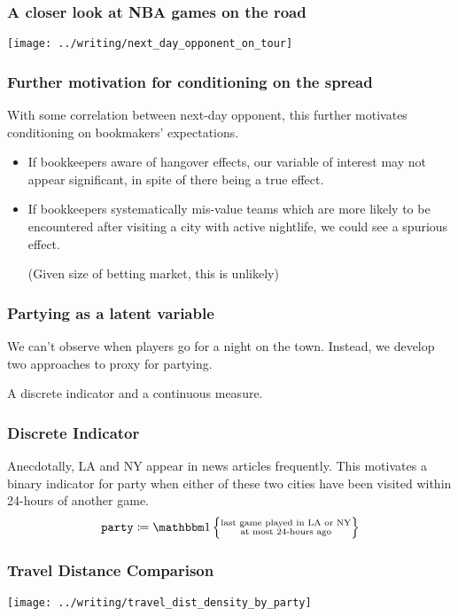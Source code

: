 \documentclass{beamer}
\begin{document}
\begin{frame}   \frametitle{A closer look at NBA games on the road}
  \centering \texttt{[image: ../writing/next\_day\_opponent\_on\_tour]} \end{frame}

\begin{frame}   \frametitle{Further motivation for conditioning on the spread}
  \begin{block}{With some correlation between next-day opponent, this further motivates conditioning
  on bookmakers' expectations.}
  \begin{itemize}     \item If bookkeepers aware of hangover effects, our variable of interest may not appear significant, in spite of there being a true effect.

    \item If bookkeepers systematically mis-value teams which are more likely to be encountered after visiting a city with active nightlife, we could see a spurious effect.

      (Given size of betting market, this is unlikely)
    \end{itemize}   \end{block}
\end{frame}

\begin{frame}   \frametitle{Partying as a latent variable}
  \begin{block}{We can't observe when players go for a night on the town.}
    Instead, we develop two approaches to proxy for partying. 

    A discrete indicator and a continuous measure.
  \end{block} \end{frame}

\begin{frame}   \frametitle{Discrete Indicator}
  \begin{block}{Anecdotally, LA and NY appear in news articles frequently.}     This motivates a binary indicator for party when either of these two cities have been visited within 24-hours of another game.
    \[
      \texttt{party} \coloneqq \mathbbm 1 \left \{\substack{\textrm{last game played in LA or NY} \\ \textrm{at most 24-hours ago}}\right \}
    \]   \end{block} \end{frame}


\begin{frame}   
  \frametitle{Travel Distance Comparison}
  \centering \texttt{[image: ../writing/travel\_dist\_density\_by\_party]} 
\end{frame}
\end{document}
